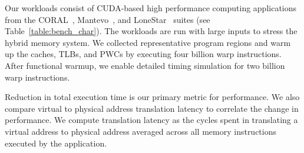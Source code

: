 \noindent Our workloads consist of CUDA-based high performance
computing applications from the CORAL~\cite{CORAL},
Mantevo~\cite{mantevo}, and LoneStar~\cite{lonestar} suites (see
Table~\ref{table:bench_char}). The workloads are run with large inputs
to stress the hybrid memory system. We collected representative
program regions and warm up the caches, TLBs, and PWCs by
executing four billion warp instructions. After functional warmup, we
enable detailed timing simulation for two billion warp instructions.

Reduction in total execution time is our primary metric for
performance. We also compare virtual to physical address translation
latency to correlate the change in performance. We compute translation
latency as the cycles spent in translating a virtual address to
physical address averaged across all memory instructions executed by
the application.

